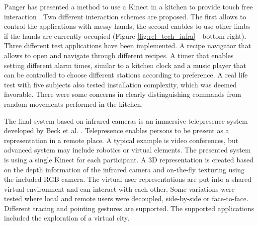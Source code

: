 Panger has presented a method to use a Kinect in a kitchen to provide touch free interaction \cite{panger2012kinect}. Two different interaction schemes are proposed. The first allows to control the applications with messy hands, the second enables to use other limbs if the hands are currently occupied (Figure \ref{fig:rel_tech_infra} - bottom right). Three different test applications have been implemented. A recipe navigator that allows to open and navigate through different recipes. A timer that enables setting different alarm times, similar to a kitchen clock and a music player that can be controlled to choose different stations according to preference. A real life test with five subjects also tested installation complexity, which was deemed favorable. There were some concerns in clearly distinguishing commands from random movements performed in the kitchen.

The final system based on infrared cameras is an immersive telepresence system developed by Beck et al. \cite{beck2013immersive}. Telepresence enables persons to be present as a representation in a remote place. A typical example is video conferences, but advanced system may include robotics or virtual elements. The presented system is using a single Kinect for each participant. A 3D representation is created based on the depth information of the infrared camera and on-the-fly texturing using the included RGB camera. The virtual user representations are put into a shared virtual environment and can interact with each other. Some variations were tested where local and remote users were decoupled, side-by-side or face-to-face. Different tracing and pointing gestures are supported. The supported applications included the exploration of a virtual city.

